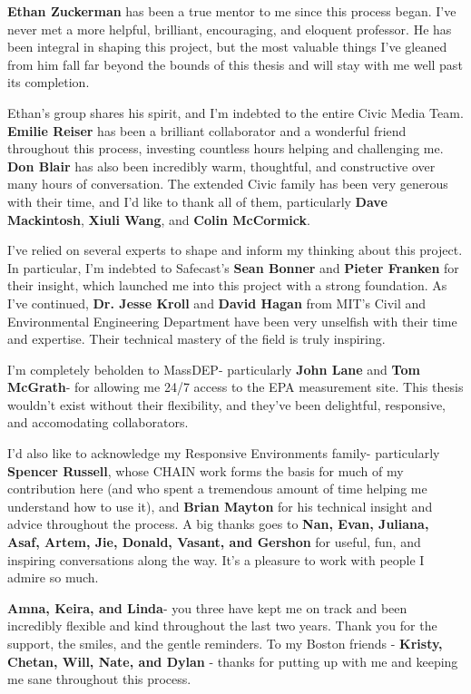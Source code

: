 \textbf{Ethan Zuckerman} has been a true mentor to me since this process began.  I've never met a more helpful, brilliant, encouraging, and eloquent professor.  He has been integral in shaping this project, but the most valuable things I've gleaned from him fall far beyond the bounds of this thesis and will stay with me well past its completion.  

Ethan's group shares his spirit, and I'm indebted to the entire Civic Media Team.  \textbf{Emilie Reiser} has been a brilliant collaborator and a wonderful friend throughout this process, investing countless hours helping and challenging me.  \textbf{Don Blair} has also been incredibly warm, thoughtful, and constructive over many hours of conversation.  The extended Civic family has been very generous with their time, and I'd like to thank all of them, particularly \textbf{Dave Mackintosh}, \textbf{Xiuli Wang}, and \textbf{Colin McCormick}.

I've relied on several experts to shape and inform my thinking about this project.  In particular, I'm indebted to Safecast's \textbf{Sean Bonner} and \textbf{Pieter Franken} for their insight, which launched me into this project with a strong foundation.  As I've continued, \textbf{Dr. Jesse Kroll} and \textbf{David Hagan} from MIT's Civil and Environmental Engineering Department have been very unselfish with their time and expertise.  Their technical mastery of the field is truly inspiring.     

I'm completely beholden to MassDEP- particularly \textbf{John Lane} and \textbf{Tom McGrath}- for allowing me 24/7 access to the EPA measurement site.  This thesis wouldn't exist without their flexibility, and they've been delightful, responsive, and accomodating collaborators. 

I'd also like to acknowledge my Responsive Environments family- particularly \textbf{Spencer Russell}, whose CHAIN work forms the basis for much of my contribution here (and who spent a tremendous amount of time helping me understand how to use it), and \textbf{Brian Mayton} for his technical insight and advice throughout the process.  A big thanks goes to \textbf{Nan, Evan, Juliana, Asaf, Artem, Jie, Donald, Vasant, and Gershon} for useful, fun, and inspiring conversations along the way.  It's a pleasure to work with people I admire so much.

\textbf{Amna, Keira, and Linda}- you three have kept me on track and been incredibly flexible and kind throughout the last two years.  Thank you for the support, the smiles, and the gentle reminders.  To my Boston friends - \textbf{Kristy, Chetan, Will, Nate, and Dylan} - thanks for putting up with me and keeping me sane throughout this process.  

